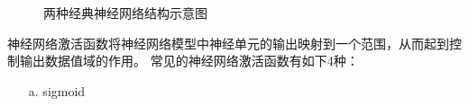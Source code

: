 \documentclass[AutoFakeBold]{LZUThesis}
\begin{document}
\begin{figure}[H]
	\centering
    \caption{两种经典神经网络结构示意图}
    \label{fig_nn}
\end{figure}

神经网络激活函数将神经网络模型中神经单元的输出映射到一个范围，从而起到控制输出数据值域的作用。
常见的神经网络激活函数有如下4种：
\begin{itemize}
\item[a. ] sigmoid
\end{itemize}
\end{document}
